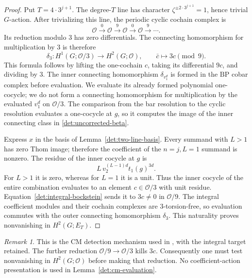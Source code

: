 \documentclass[11pt]{article}
\theoremstyle{definition}
\theoremstyle{remark}
\newtheorem{remark}[theorem]{Remark}
\numberwithin{equation}{section}
\begin{document}
\begin{proof}
Put \(T=4\cdot3^{j+1}\).
The degree-\(T\) line has character
\(\zeta^{\pm2\cdot3^{j+1}}=1\), hence trivial \(G\)-action.
After trivializing this line, the periodic cyclic cochain
complex is
\[
 \mathcal O\xrightarrow{0}\mathcal O\xrightarrow{9}\mathcal O
       \xrightarrow{0}\mathcal O\xrightarrow{9}\cdots.
\]
Its reduction modulo \(3\) has zero differentials.
The connecting homomorphism for multiplication by \(3\)
is therefore
\begin{equation}\label{det:integral-bockstein}
 \delta_3:H^1(G;\mathcal O/3)\longrightarrow H^2(G;\mathcal O),
 \qquad
 \bar c\longmapsto3c\pmod9 .
\end{equation}
This formula follows by lifting the one-cochain \(c\),
taking its differential \(9c\), and dividing by \(3\).
The inner connecting homomorphism \(\delta_{v_1^d}\) is
formed in the \(\mathrm{BP}\) cobar complex before evaluation.
We evaluate its already formed polynomial one-cocycle;
we do not form a connecting homomorphism for multiplication
by the evaluated \(v_1^d\) on \(\mathcal O/3\).
The comparison from the bar resolution to the cyclic
resolution evaluates a one-cocycle at \(g\), so it computes
the image of the inner connecting class in
\eqref{det:uncorrected-beta}.

Express \(x\) in the basis of Lemma~\ref{det:two-line-basis}.
Every summand with \(L>1\) has zero Thom image; therefore the
coefficient of the \(n=j,L=1\) summand is nonzero.
The residue of the inner cocycle at \(g\) is
\[
 L\,v_2^{(L-1)d}t_1(g)^{3d}.
\]
For \(L>1\) it is zero, whereas for \(L=1\) it is a unit.
Thus the inner cocycle of the entire combination evaluates
to an element \(c\in\mathcal O/3\) with unit residue.
Equation~\eqref{det:integral-bockstein} sends it to
\(3c\ne0\) in \(\mathcal O/9\).
The integral coefficient modules and their cochain complexes
are \(3\)-torsion-free, so evaluation commutes with the
outer connecting homomorphism \(\delta_3\).
This naturality proves nonvanishing in \(H^2(G;E_T)\).
\end{proof}

\begin{remark}\label{det:integral-target}
This is the CM detection mechanism used in
\cite[Section~6]{BR}, with the integral target retained.
The further reduction
\(\mathcal O/9\to\mathcal O/3\) kills \(3c\).
Consequently one must test nonvanishing in
\(H^2(G;\mathcal O)\) before making that reduction.
No coefficient-action presentation is used in
Lemma~\ref{det:cm-evaluation}.
\end{remark}
\end{document}
